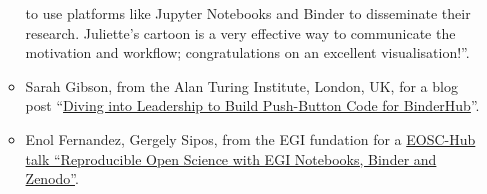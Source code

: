 \begin{enumerate}
\begin{itemize}
    to use platforms like Jupyter Notebooks and Binder to disseminate
    their research. Juliette's cartoon is a very effective way to
    communicate the motivation and workflow; congratulations on an
    excellent visualisation!''.
  \item Sarah Gibson, from the Alan Turing Institute, London, UK, for
    a blog post
    ``\href{https://blog.jupyter.org/diving-into-leadership-to-build-push-button-code-df2a075c9914}{Diving
      into Leadership to Build Push-Button Code for BinderHub}''.
  \item Enol Fernandez, Gergely Sipos, from the EGI fundation for a
    \href{https://www.slideshare.net/EGI_Foundation/reproducible-open-science-with-egi-notebooks-binder-and-zenodo}{EOSC-Hub talk ``Reproducible Open Science with EGI Notebooks, Binder and Zenodo''}.
  \end{itemize}
\end{enumerate}






